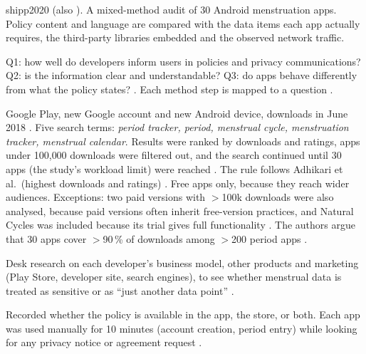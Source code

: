 \begin{papercard}{shipp2020}
   (also ). A mixed-method audit of 30 Android menstruation apps. Policy content and language are compared with the data items each app actually requires, the third-party libraries embedded and the observed network traffic.

 Q1: how well do developers inform users in policies and privacy communications? Q2: is the information clear and understandable? Q3: do apps behave differently from what the policy states? . Each method step is mapped to a question .

 Google Play, new Google account and new Android device, downloads in June 2018 . Five search terms: \emph{period tracker, period, menstrual cycle, menstruation tracker, menstrual calendar}. Results were ranked by downloads and ratings, apps under 100{,}000 downloads were filtered out, and the search continued until 30 apps (the study's workload limit) were reached . The rule follows Adhikari et al.\ (highest downloads and ratings) . Free apps only, because they reach wider audiences. Exceptions: two paid versions with $>$100k downloads were also analysed, because paid versions often inherit free-version practices, and Natural Cycles was included because its trial gives full functionality . The authors argue that 30 apps cover $>$90\,\% of downloads among $>$200 period apps .

 Desk research on each developer's business model, other products and marketing (Play Store, developer site, search engines), to see whether menstrual data is treated as sensitive or as ``just another data point'' .

 Recorded whether the policy is available in the app, the store, or both. Each app was used manually for 10 minutes (account creation, period entry) while looking for any privacy notice or agreement request .


\end{papercard}
